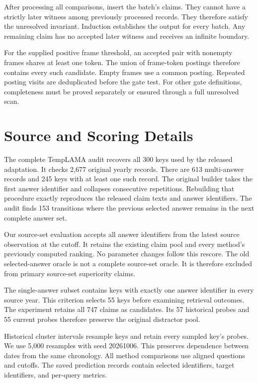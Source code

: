After processing all comparisons, insert the batch's claims.
They cannot have a strictly later witness among previously processed records.
They therefore satisfy the unresolved invariant.
Induction establishes the output for every batch.
Any remaining claim has no accepted later witness and receives an infinite boundary.

For the supplied positive frame threshold, an accepted pair with nonempty frames shares at least one token.
The union of frame-token postings therefore contains every such candidate.
Empty frames use a common posting.
Repeated posting visits are deduplicated before the gate test.
For other gate definitions, completeness must be proved separately or ensured through a full unresolved scan.

\section{Source and Scoring Details}
\label{app:source}

The complete TempLAMA audit recovers all 300 keys used by the released adaptation.
It checks 2,677 original yearly records.
There are 613 multi-answer records and 245 keys with at least one such record.
The original builder takes the first answer identifier and collapses consecutive repetitions.
Rebuilding that procedure exactly reproduces the released claim texts and answer identifiers.
The audit finds 153 transitions where the previous selected answer remains in the next complete answer set.

Our source-set evaluation accepts all answer identifiers from the latest source observation at the cutoff.
It retains the existing claim pool and every method's previously computed ranking.
No parameter changes follow this rescore.
The old selected-answer oracle is not a complete source-set oracle.
It is therefore excluded from primary source-set superiority claims.

The single-answer subset contains keys with exactly one answer identifier in every source year.
This criterion selects 55 keys before examining retrieval outcomes.
The experiment retains all 747 claims as candidates.
Its 57 historical probes and 55 current probes therefore preserve the original distractor pool.

Historical cluster intervals resample keys and retain every sampled key's probes.
We use 5,000 resamples with seed 20261006.
This preserves dependence between dates from the same chronology.
All method comparisons use aligned questions and cutoffs.
The saved prediction records contain selected identifiers, target identifiers, and per-query metrics.

